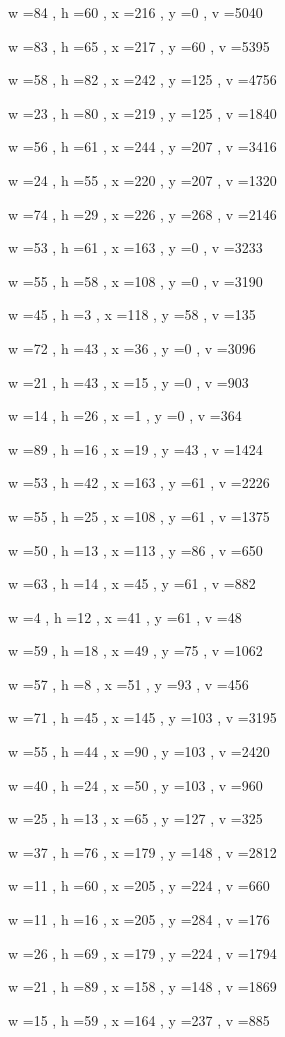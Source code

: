 \documentclass[11pt]{article}
\begin{document}
w =84 , h =60 , x =216 , y =0 , v =5040
\par
w =83 , h =65 , x =217 , y =60 , v =5395
\par
w =58 , h =82 , x =242 , y =125 , v =4756
\par
w =23 , h =80 , x =219 , y =125 , v =1840
\par
w =56 , h =61 , x =244 , y =207 , v =3416
\par
w =24 , h =55 , x =220 , y =207 , v =1320
\par
w =74 , h =29 , x =226 , y =268 , v =2146
\par
w =53 , h =61 , x =163 , y =0 , v =3233
\par
w =55 , h =58 , x =108 , y =0 , v =3190
\par
w =45 , h =3 , x =118 , y =58 , v =135
\par
w =72 , h =43 , x =36 , y =0 , v =3096
\par
w =21 , h =43 , x =15 , y =0 , v =903
\par
w =14 , h =26 , x =1 , y =0 , v =364
\par
w =89 , h =16 , x =19 , y =43 , v =1424
\par
w =53 , h =42 , x =163 , y =61 , v =2226
\par
w =55 , h =25 , x =108 , y =61 , v =1375
\par
w =50 , h =13 , x =113 , y =86 , v =650
\par
w =63 , h =14 , x =45 , y =61 , v =882
\par
w =4 , h =12 , x =41 , y =61 , v =48
\par
w =59 , h =18 , x =49 , y =75 , v =1062
\par
w =57 , h =8 , x =51 , y =93 , v =456
\par
w =71 , h =45 , x =145 , y =103 , v =3195
\par
w =55 , h =44 , x =90 , y =103 , v =2420
\par
w =40 , h =24 , x =50 , y =103 , v =960
\par
w =25 , h =13 , x =65 , y =127 , v =325
\par
w =37 , h =76 , x =179 , y =148 , v =2812
\par
w =11 , h =60 , x =205 , y =224 , v =660
\par
w =11 , h =16 , x =205 , y =284 , v =176
\par
w =26 , h =69 , x =179 , y =224 , v =1794
\par
w =21 , h =89 , x =158 , y =148 , v =1869
\par
w =15 , h =59 , x =164 , y =237 , v =885
\end{document}
